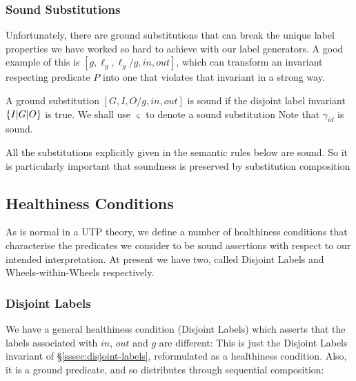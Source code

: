 \subsubsection{Sound Substitutions}

Unfortunately, there are ground substitutions
that can break the unique label properties
we have worked so hard to achieve with our label generators.
A good example of this is $[g,\ell_g,\ell_g/g,in,out]$,
which can transform an invariant respecting predicate $P$
into one that violates that invariant in a strong way.

A ground substitution $[G,I,O/g,in,out]$ is sound
if the disjoint label invariant $\{I|G|O\}$ is true.
We shall use $\varsigma$ to denote a sound substitution
Note that $\gamma_{id}$ is sound.

All the substitutions explicitly given in the semantic rules below
are sound.
So it is particularly important that soundness is preserved by
substitution composition




\subsection{Healthiness Conditions}

As is normal in a UTP theory,
we define a number of healthiness conditions
that characterise the predicates we consider to be sound assertions
with respect to our intended interpretation.
At present we have two, called Disjoint Labels
and Wheels-within-Wheels respectively.

\subsubsection{Disjoint Labels}\label{sssec:disj-labels}

We have a general healthiness condition (Disjoint Labels) which asserts
that the labels associated with $in$, $out$ and $g$
are different:
This is just the Disjoint Labels invariant of \S\ref{sssec:disjoint-labels},
reformulated as a healthiness condition.
Also, it is a ground predicate, and so distributes
through sequential composition:

